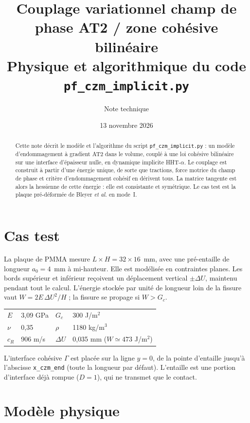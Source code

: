 \documentclass[11pt,a4paper]{article}
\title{Couplage variationnel champ de phase AT2 / zone cohésive bilinéaire\\
\large Physique et algorithmique du code \texttt{pf\_czm\_implicit.py}}
\author{Note technique}
\date{13 novembre 2026}
\begin{document}
\maketitle

\begin{abstract}
Cette note décrit le modèle et l'algorithme du script \texttt{pf\_czm\_implicit.py} : un modèle
d'endommagement à gradient AT2 dans le volume, couplé à une loi cohésive bilinéaire sur une interface
d'épaisseur nulle, en dynamique implicite HHT-$\alpha$. Le couplage est construit à partir d'une
énergie unique, de sorte que tractions, force motrice du champ de phase et critère d'endommagement
cohésif en dérivent tous. La matrice tangente est alors la hessienne de cette énergie : elle est
consistante et symétrique. Le cas test est la plaque pré-déformée de Bleyer \emph{et al.} en mode~I.
\end{abstract}

\section{Cas test}
La plaque de PMMA mesure $L\times H = 32\times 16$~mm, avec une pré-entaille de longueur $a_0=4$~mm
à mi-hauteur. Elle est modélisée en contraintes planes. Les bords supérieur et inférieur reçoivent un
déplacement vertical $\pm\Delta U$, maintenu pendant tout le calcul. L'énergie stockée par unité de
longueur loin de la fissure vaut $W = 2E\,\Delta U^2/H$ ; la fissure se propage si $W>G_c$.

\begin{center}
\begin{tabular}{llll}
\toprule
$E$ & 3{,}09 GPa & $G_c$ & 300 J/m$^2$\\
$\nu$ & 0{,}35 & $\rho$ & 1180 kg/m$^3$\\
$c_R$ & 906 m/s & $\Delta U$ & 0{,}035 mm ($W\simeq 473$ J/m$^2$)\\
\bottomrule
\end{tabular}
\end{center}

L'interface cohésive $\Gamma$ est placée sur la ligne $y=0$, de la pointe d'entaille jusqu'à
l'abscisse \texttt{x\_czm\_end} (toute la longueur par défaut). L'entaille est une portion d'interface
déjà rompue ($D=1$), qui ne transmet que le contact.

\section{Modèle physique}
\end{document}
